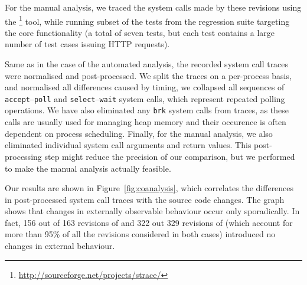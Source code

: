 
For the manual analysis, we traced the system calls made by these revisions
using the
\footnote{\url{http://sourceforge.net/projects/strace/}} tool,
while running subset of the tests from the \lighttpd regression suite targeting
the core functionality (a total of seven tests, but each test contains a large
number of test cases issuing HTTP requests).


Same as in the case of the automated analysis, the recorded system call traces
were normalised and post-processed. We split the traces on a per-process basis,
and normalised all differences caused by timing, \eg we collapsed all sequences
of \lstinline`accept`--\lstinline`poll` and
\lstinline`select`--\lstinline`wait` system calls, which represent repeated
polling operations. We have also eliminated any \lstinline`brk` system calls
from traces, as these calls are usually used for managing heap memory and their
occurence is often dependent on process scheduling.  Finally, for the manual
analysis, we also eliminated individual system call arguments and return
values. This post-processing step might reduce the precision of our comparison,
but we performed to make the manual analysis actually feasible.

Our results are shown in Figure~\ref{fig:coanalysis}, which correlates the
differences in post-processed system call traces with the source code changes.
The graph shows that changes in externally observable behaviour occur only
sporadically. In fact, 156 out of 163 revisions of \lighttpd and 322
out 329 revisions of \vim (which account for more than 95\% of all the
revisions considered in both cases) introduced no changes in external
behaviour.



